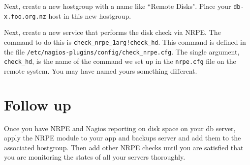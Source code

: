 \documentclass{article}   	%
\begin{document}
Next, create a new hostgroup with a name like ``Remote Disks".  Place your \texttt{db-x.foo.org.nz} host in this new hostgroup.

Next, create a new service that performs the disk check via NRPE.  The command to do this is \texttt{check\_nrpe\_1arg!check\_hd}.  This command is defined in the file \texttt{/etc/nagios-plugins/config/check\_nrpe.cfg}.  The single argument, \texttt{check\_hd}, is the name of the command we set up in the \texttt{nrpe.cfg} file on the remote system. You may have named yours something different.

\section{Follow up}
Once you have NRPE and Nagios reporting on disk space on your db server, apply the NRPE module to your app and backups server and add them to the associated hostgroup. Then add other NRPE checks until you are satisfied that you are monitoring the states of all your servers thoroughly.
\end{document}
